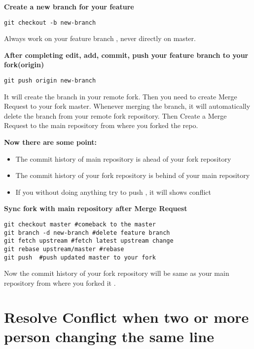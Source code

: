 \documentclass{article}
\begin{document}
\textbf{Create a new branch for your feature}
\begin{lstlisting}
git checkout -b new-branch
\end{lstlisting}
Always work on your feature branch , never directly on master.


\textbf{After completing edit, add, commit, push your feature branch to your fork(origin)}
\begin{lstlisting}
git push origin new-branch 
\end{lstlisting}


It will create the branch in your remote fork.
Then you need to create Merge Request to your fork master. 
Whenever merging the branch, it will automatically delete the branch from your remote fork repository. 
Then Create a Merge Request to the main repository from where you forked the repo.


\textbf{Now there are some point: }
\begin{itemize}
	\item The commit history of main repository is ahead of your fork repository
	\item The commit history of your fork repository is behind of your main repository
	\item If you without doing anything try to push , it will shows conflict 
\end{itemize}


\textbf{Sync fork with main repository after Merge Request}
\begin{lstlisting}
git checkout master #comeback to the master
git branch -d new-branch #delete feature branch
git fetch upstream #fetch latest upstream change
git rebase upstream/master #rebase  
git push  #push updated master to your fork	
\end{lstlisting}


Now the commit history of your fork repository will be same as your main repository from where you forked it . 

\section{Resolve Conflict when two or more person changing the same line}
\end{document}
